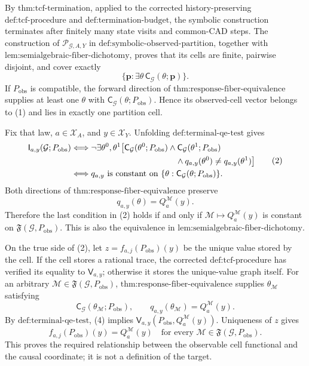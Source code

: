 By \(\text{thm:tcf-termination}\), applied to the corrected history-preserving \(\text{def:tcf-procedure}\) and \(\text{def:termination-budget}\), the symbolic construction terminates after finitely many state visits and common-CAD steps. The construction of \(\mathscr P_{\mathcal G,A,Y}\) in \(\text{def:symbolic-observed-partition}\), together with \(\text{lem:semialgebraic-fiber-dichotomy}\), proves that its cells are finite, pairwise disjoint, and cover exactly
\[
\{\mathbf p:\exists\theta\,\mathsf C_{\mathcal G}(\theta;\mathbf p)\}.
\tag{1}
\]
If \(P_{\mathrm{obs}}\) is compatible, the forward direction of \(\text{thm:response-fiber-equivalence}\) supplies at least one \(\theta\) with \(\mathsf C_{\mathcal G}(\theta;P_{\mathrm{obs}})\). Hence its observed-cell vector belongs to (1) and lies in exactly one partition cell.

Fix that law, \(a\in\mathcal X_A\), and \(y\in\mathcal X_Y\). Unfolding \(\text{def:terminal-qe-test}\) gives
\[
\begin{aligned}
\mathsf I_{a,y}(\mathcal G;P_{\mathrm{obs}})
&\Longleftrightarrow
\neg\exists\theta^0,\theta^1\bigl[
\mathsf C_{\mathcal G}(\theta^0;P_{\mathrm{obs}})
\wedge\mathsf C_{\mathcal G}(\theta^1;P_{\mathrm{obs}})\\
&\hspace{44mm}\wedge
q_{a,y}(\theta^0)\neq q_{a,y}(\theta^1)
\bigr]\\
&\Longleftrightarrow
q_{a,y}\text{ is constant on }
\{\theta:\mathsf C_{\mathcal G}(\theta;P_{\mathrm{obs}})\}.
\end{aligned}
\tag{2}
\]
Both directions of \(\text{thm:response-fiber-equivalence}\) preserve
\[
q_{a,y}(\theta)=Q_a^{\mathcal M}(y).
\tag{3}
\]
Therefore the last condition in (2) holds if and only if \(\mathcal M\mapsto Q_a^{\mathcal M}(y)\) is constant on \(\mathfrak F(\mathcal G,P_{\mathrm{obs}})\). This is also the equivalence in \(\text{lem:semialgebraic-fiber-dichotomy}\).

On the true side of (2), let \(z=f_{a,j}(P_{\mathrm{obs}})(y)\) be the unique value stored by the cell. If the cell stores a rational trace, the corrected \(\text{def:tcf-procedure}\) has verified its equality to \(\mathsf V_{a,y}\); otherwise it stores the unique-value graph itself. For an arbitrary \(\mathcal M\in\mathfrak F(\mathcal G,P_{\mathrm{obs}})\), \(\text{thm:response-fiber-equivalence}\) supplies \(\theta_{\mathcal M}\) satisfying
\[
\mathsf C_{\mathcal G}(\theta_{\mathcal M};P_{\mathrm{obs}}),
\qquad
q_{a,y}(\theta_{\mathcal M})=Q_a^{\mathcal M}(y).
\tag{4}
\]
By \(\text{def:terminal-qe-test}\), (4) implies \(\mathsf V_{a,y}(P_{\mathrm{obs}},Q_a^{\mathcal M}(y))\). Uniqueness of \(z\) gives
\[
f_{a,j}(P_{\mathrm{obs}})(y)=Q_a^{\mathcal M}(y)
\quad\text{for every }\mathcal M\in\mathfrak F(\mathcal G,P_{\mathrm{obs}}).
\tag{5}
\]
This proves the required relationship between the observable cell functional and the causal coordinate; it is not a definition of the target.

